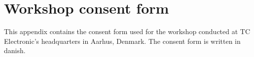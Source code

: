 \chapter{Workshop consent form}
\label{App:ConsentForm}
This appendix contains the consent form used for the workshop conducted at TC Electronic's headquarters in Aarhus, Denmark. The consent form is written in danish.

